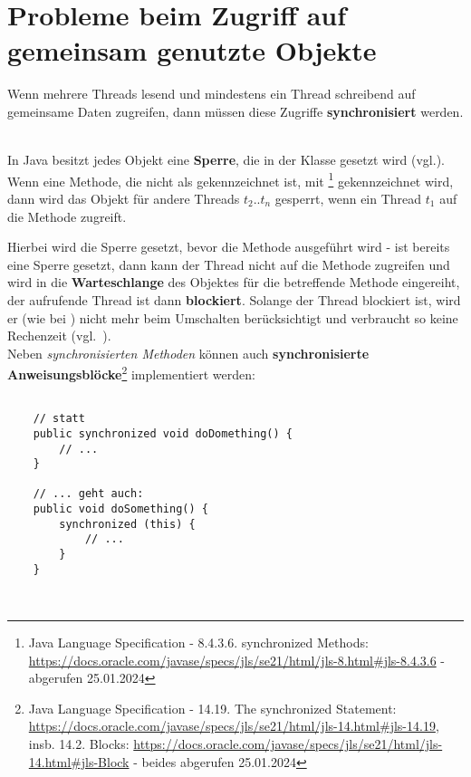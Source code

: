 \section{Probleme beim Zugriff auf gemeinsam genutzte Objekte}

\begin{tcolorbox}
   Wenn mehrere Threads lesend und mindestens ein Thread schreibend auf gemeinsame Daten zugreifen, dann müssen diese Zugriffe \textbf{synchronisiert} werden.
\end{tcolorbox}\\

In Java besitzt jedes Objekt eine \textbf{Sperre}, die in der Klasse  gesetzt wird (vgl.\cite[26]{Oec22}).\\

Wenn eine Methode, die nicht als  gekennzeichnet ist, mit \footnote{
    Java Language Specification - 8.4.3.6. synchronized Methods: \url{https://docs.oracle.com/javase/specs/jls/se21/html/jls-8.html#jls-8.4.3.6} - abgerufen 25.01.2024
} gekennzeichnet wird, dann wird das Objekt für andere Threads $t_2..t_n$ gesperrt, wenn ein Thread $t_1$ auf die Methode zugreift.

Hierbei wird die Sperre gesetzt, bevor die Methode ausgeführt wird - ist bereits eine Sperre gesetzt, dann kann der Thread nicht auf die Methode zugreifen und wird in die \textbf{Warteschlange} des Objektes für die betreffende Methode eingereiht, der aufrufende Thread ist dann \textbf{blockiert}.
Solange der Thread blockiert ist, wird er (wie bei ) nicht mehr beim Umschalten berücksichtigt und verbraucht so keine Rechenzeit (vgl.~\cite[26]{Oec22}).
\\

Neben \textit{synchronisierten Methoden} können auch \textbf{synchronisierte Anweisungsblöcke}\footnote{
Java Language Specification - 14.19. The synchronized Statement: \url{https://docs.oracle.com/javase/specs/jls/se21/html/jls-14.html#jls-14.19}, insb. 14.2. Blocks: \url{https://docs.oracle.com/javase/specs/jls/se21/html/jls-14.html#jls-Block} - beides abgerufen 25.01.2024
} implementiert werden:\\

\begin{verbatim}

    // statt
    public synchronized void doDomething() {
        // ...
    }

    // ... geht auch:
    public void doSomething() {
        synchronized (this) {
            // ...
        }
    }
\end{verbatim}\\

